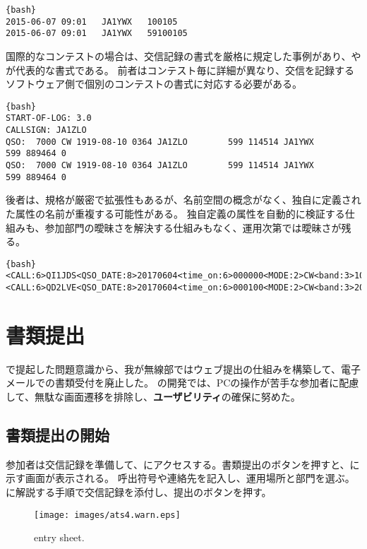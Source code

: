 \documentclass[10pt,a4paper]{book}
\begin{document}
\begin{Verbatim}{bash}
2015-06-07 09:01   JA1YWX   100105
2015-06-07 09:01   JA1YWX   59100105
\end{Verbatim}

国際的なコンテストの場合は、交信記録の書式を厳格に規定した事例があり、\cbr{}や\adi{}が代表的な書式である。
前者はコンテスト毎に詳細が異なり、交信を記録するソフトウェア側で個別のコンテストの書式に対応する必要がある。

\begin{Verbatim}{bash}
START-OF-LOG: 3.0
CALLSIGN: JA1ZLO
QSO:  7000 CW 1919-08-10 0364 JA1ZLO        599 114514 JA1YWX        599 889464 0
QSO:  7000 CW 1919-08-10 0364 JA1ZLO        599 114514 JA1YWX        599 889464 0
\end{Verbatim}

後者は、規格が厳密で拡張性もあるが、名前空間の概念がなく、独自に定義された属性の名前が重複する可能性がある。
独自定義の属性を自動的に検証する仕組みも、参加部門の曖昧さを解決する仕組みもなく、運用次第では曖昧さが残る。

\begin{Verbatim}{bash}
<CALL:6>QI1JDS<QSO_DATE:8>20170604<time_on:6>000000<MODE:2>CW<band:3>10m<RST_RCVD:3>599<SRX:4>1005<eor>
<CALL:6>QD2LVE<QSO_DATE:8>20170604<time_on:6>000100<MODE:2>CW<band:3>20m<RST_RCVD:3>599<SRX:4>1336<eor>
\end{Verbatim}

\chapter{書類提出}

で提起した問題意識から、我が無線部ではウェブ提出の仕組みを構築して、電子メールでの書類受付を廃止した。
の開発では、PCの操作が苦手な参加者に配慮して、無駄な画面遷移を排除し、\textbf{ユーザビリティ}の確保に努めた。

\section{書類提出の開始\label{sect:entry}}

参加者は交信記録を準備して、にアクセスする。書類提出のボタンを押すと、に示す画面が表示される。
呼出符号や連絡先を記入し、運用場所と部門を選ぶ。に解説する手順で交信記録を添付し、提出のボタンを押す。

\begin{figure}[H]
\vspace{1ex}
\centering
\texttt{[image: images/ats4.warn.eps]}
\caption{entry sheet.\label{fig:entry}}
\end{figure}
\end{document}
